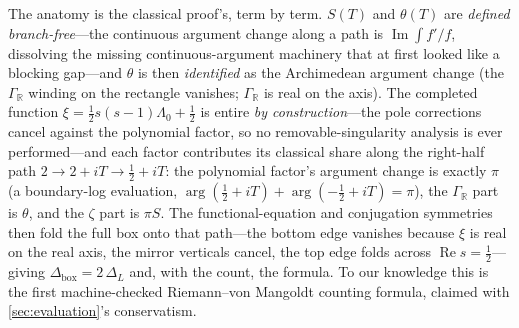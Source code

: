 The anatomy is the classical proof's, term by term. $S(T)$ and $\theta(T)$ are
\emph{defined branch-free}---the continuous argument change along a path is
$\operatorname{Im}\int f'/f$, dissolving the missing continuous-argument
machinery that at first looked like a blocking gap---and $\theta$ is then
\emph{identified} as the Archimedean argument change (the
$\Gamma_{\mathbb R}$ winding on the rectangle vanishes;
$\Gamma_{\mathbb R}$ is real on the axis). The completed function
$\xi = \tfrac12 s(s-1)\Lambda_0 + \tfrac12$ is entire \emph{by
construction}---the pole corrections cancel against the polynomial factor, so
no removable-singularity analysis is ever performed---and each factor
contributes its classical share along the right-half path
$2 \to 2{+}iT \to \tfrac12{+}iT$: the polynomial factor's argument change is
exactly $\pi$ (a boundary-log evaluation,
$\arg(\tfrac12+iT) + \arg(-\tfrac12+iT) = \pi$), the $\Gamma_{\mathbb R}$ part
is $\theta$, and the $\zeta$ part is $\pi S$. The functional-equation and
conjugation symmetries then fold the full box onto that path---the bottom edge
vanishes because $\xi$ is real on the real axis, the mirror verticals cancel,
the top edge folds across $\operatorname{Re} s = \tfrac12$---giving
$\Delta_{\mathrm{box}} = 2\,\Delta_L$ and, with the count, the formula. To our
knowledge this is the first machine-checked Riemann--von Mangoldt counting
formula, claimed with \cref{sec:evaluation}'s conservatism.

